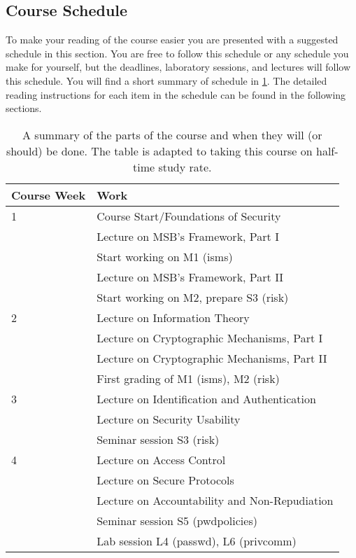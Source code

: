 \subsection{Course Schedule}
\label{sec:schedule}
To make your reading of the course easier you are presented with a suggested 
schedule in this section.
You are free to follow this schedule or any schedule you make for yourself, but 
the deadlines, laboratory sessions, and lectures will follow this schedule.
You will find a short summary of schedule in \cref{Schedule}.
The detailed reading instructions for each item in the schedule can be found in 
the following sections.

\begin{table}
	\centering
  \caption{%
    A summary of the parts of the course and when they will (or should) be 
    done.
    The table is adapted to taking this course on half-time study rate.
  }\label{Schedule}
  \begin{tabular}{lp{9cm}}
    \toprule
    \textbf{Course Week}	& \textbf{Work} \\
    \midrule
    1
      & Course Start/Foundations of Security\\
      & Lecture on MSB's Framework, Part I\\
      & Start working on M1 (isms)\\
      & Lecture on MSB's Framework, Part II\\
      & Start working on M2, prepare S3 (risk)\\
    \midrule
    2
      & Lecture on Information Theory\\
      & Lecture on Cryptographic Mechanisms, Part I\\
      & Lecture on Cryptographic Mechanisms, Part II\\
      & First grading of M1 (isms), M2 (risk)\\
    \midrule
    3
      & Lecture on Identification and Authentication\\
      & Lecture on Security Usability\\
      & Seminar session S3 (risk)\\
    \midrule
    4
      & Lecture on Access Control\\
      & Lecture on Secure Protocols\\
      & Lecture on Accountability and Non-Repudiation\\
      & Seminar session S5 (pwdpolicies)\\
      & Lab session L4 (passwd), L6 (privcomm)\\

\end{tabular}
\end{table}
